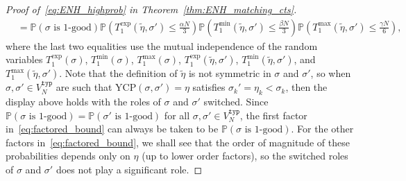 \documentclass[11pt]{article}
\numberwithin{equation}{section}
\newcommand{\p}{\mathbb{P}} %
\newcommand{\wt}{\widetilde} %
\newcommand{\ycp}{\mathrm{YCP}} %
\theoremstyle{definition}
\begin{document}
\begin{proof}[Proof of~\eqref{eq:ENH_highprob} in Theorem~\ref{thm:ENH_matching_cts}]
\begin{align}
&= \p \left( \sigma \text{ is 1-good} \right) 
\p \left( T_{1}^{\exp} \left( \wt{\eta}, \sigma' \right) \leq \frac{\alpha N}{3} \right) 
\p \left( T_{1}^{\min} \left( \wt{\eta}, \sigma' \right) \leq \frac{\beta N}{3} \right) 
\p \left( T_{1}^{\max} \left( \wt{\eta}, \sigma' \right) \leq \frac{\gamma N}{6} \right), \quad \ \ \ \label{eq:factored_bound}
\end{align}
where the last two equalities use the mutual independence of the random variables 
$T_{1}^{\exp} \left( \sigma \right)$, 
$T_{1}^{\min} \left( \sigma \right)$, 
$T_{1}^{\max} \left( \sigma \right)$, 
$T_{1}^{\exp} \left( \wt{\eta}, \sigma' \right)$, 
$T_{1}^{\min} \left( \wt{\eta}, \sigma' \right)$, 
and 
$T_{1}^{\max} \left( \wt{\eta}, \sigma' \right)$. 
Note that the definition of $\wt{\eta}$ is not symmetric in $\sigma$ and $\sigma'$, 
so when $\sigma, \sigma' \in V_{N}^{\mathtt{typ}}$ are such that 
$\ycp(\sigma, \sigma') = \eta$ satisfies $\sigma_{k}' = \eta_{k} < \sigma_{k}$, 
then the display above holds with the roles of $\sigma$ and $\sigma'$ switched. 
Since 
$\p \left( \sigma \text{ is 1-good} \right) 
= \p \left( \sigma' \text{ is 1-good} \right)$
for all $\sigma, \sigma' \in V_{N}^{\mathtt{typ}}$, 
the first factor in~\eqref{eq:factored_bound} can always be taken to be 
$\p \left( \sigma \text{ is 1-good} \right)$. 
For the other factors in~\eqref{eq:factored_bound}, we shall see that the order of magnitude of these probabilities depends only on $\eta$ (up to lower order factors), so the switched roles of $\sigma$ and $\sigma'$ does not play a significant role. 



\end{proof}
\end{document}
